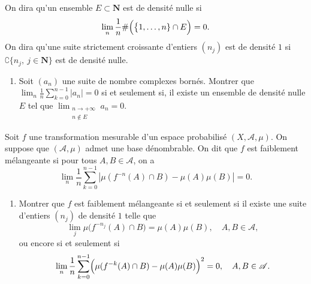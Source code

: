 \documentclass[a4paper,10pt,openany]{article}
\theoremstyle{plain}
\theoremstyle{definition}
\newcommand{\N}{\mathbf{N}}
\begin{document}
 \vspace{1.5mm}

\noindent On dira qu'un ensemble $E \subset \N$ est de densit\'e nulle si 
$$
\lim_{n} \frac{1}{n} \# \Bigl(\bigl\{1, \dots, n\}\cap E\Bigr) = 0.
$$
On dira qu'une suite strictement croissante d'entiers $(n_j)$ est de densit\'e $1$ si $\complement \{n_j,~j \in \N\}$ est de densit\'e nulle.
\begin{enumerate}
\item Soit $(a_n)$ une suite de nombre complexes born\'es. Montrer que 
$\displaystyle{
\lim_n \frac{1}{n} \sum_{k=0}^{n-1} |a_n| = 0
}
$
si et seulement si, il existe un ensemble de densit\'e nulle $E$ tel que 
$\displaystyle{\lim_{\substack{n \to +\infty \\ n\notin E}}} a_n = 0.$
\end{enumerate}
Soit $f$ une transformation mesurable d'un espace probabilis\'e $(X,\mathscr{A}, \mu)$. On suppose que $(\mathscr{A}, \mu)$ admet une base d\'enombrable. On dit que $f$ est faiblement m\'elangeante si pour tous $A, B \in \mathscr{A}$, on a 
$$
\lim_n \frac{1}{n} \sum_{k=0}^{n-1} \left|\mu(f^{-n}(A) \cap B) - \mu(A) \mu(B)\right| = 0.
$$
\begin{enumerate}[resume]
\item Montrer que $f$ est faiblement m\'elangeante si et seulement si il existe une suite d'entiers $(n_j)$ de densit\'e $1$ telle que
$$
\lim_j \mu\bigl(f^{-n_j}(A) \cap B\bigr) = \mu(A)\mu(B), \quad A,B \in \mathscr{A},
$$
ou encore si et seulement si
$$
\lim_n \frac{1}{n}\sum_{k=0}^{n-1}\Bigl(\mu(f^{-k}(A)\cap B)-\mu(A)\mu(B)\Bigr)^2  =0, \quad A,B \in \mathscr{A}.
$$
\end{enumerate}
\end{document}
